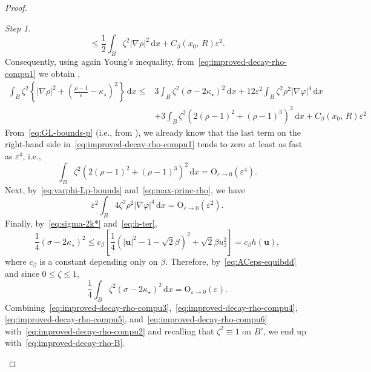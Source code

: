 \documentclass[a4paper, 11pt, twoside, leqno]{article}
\theoremstyle{definition}              %
\theoremstyle{remark}                  %
\newtheorem{step}{Step}
\newcommand{\abs}[1]{\left| #1 \right|}                             %
\renewcommand{\d}{\mathrm{d}}
\renewcommand{\u}{\mathbf{u}}
\newcommand{\eps}{\varepsilon}
\begin{document}
\begin{proof}
\begin{step}
\[		\leq \frac{1}{2} \int_B \zeta^2 \abs{\nabla \rho}^2\,{\d}x + C_\beta(x_0,\,R) \eps^2.
	\]
	Consequently, using again Young's inequality, 
	from~\eqref{eq:improved-decay-rho-compu1} 
	we obtain , 
	\begin{equation}\label{eq:improved-decay-rho-compu3}
	\begin{split}
		\int_B \zeta^2 \left\{ \abs{\nabla \rho}^2 + \left(\frac{\rho-1}{\eps} - \kappa_\star\right)^2 \right\} \,{\d}x 
		\leq & 3 \int_B \zeta^2 (\sigma - 2 \kappa_\star)^2 \,{\d}x 
		+ 12 \eps^2 \int_B \zeta^2 \rho^2 \abs{\nabla \varphi}^4   \,{\d}x \\
		&+ 3 \int_B \zeta^2 \left( 2 (\rho-1)^2 + (\rho-1)^3 \right)^2 \,{\d}x 
		+ C_\beta(x_0,\,R) \eps^2
	\end{split}
	\end{equation}
	From~\eqref{eq:GL-bounds-p} (i.e., from \cite[Proposition~2.6]{CDS1}), we already 
	know that the last term on the right-hand side 
	in~\eqref{eq:improved-decay-rho-compu1} tends to zero at least 
	as fast as $\eps^4$, i.e., 
	\begin{equation}\label{eq:improved-decay-rho-compu4}
		\int_B \zeta^2 \left( 2 (\rho-1)^2 + (\rho-1)^3 \right)^2 \,{\d}x
		= \mathrm{O}_{\eps \to 0}(\eps^4).
	\end{equation}	   
	Next, by~\eqref{eq:varphi-Lp-bounds} and~\eqref{eq:max-princ-rho}, we have 
	\begin{equation}\label{eq:improved-decay-rho-compu5}
		\eps^2 \int_B 4 \zeta^2 \rho^2 \abs{\nabla \varphi}^4 \,{\d}x 
		= \mathrm{O}_{\eps \to 0}(\eps^2).
	\end{equation}
	Finally, by~\eqref{eq:sigma-2k*} and~\eqref{eq:h-ter}, 
	\[
		\frac{1}{4} (\sigma - 2 \kappa_\star)^2
		\leq c_\beta\left[ \frac{1}{4}\left(\abs{\u}^2 - 1 - \sqrt{2}\beta \right)^2 + \sqrt{2}\beta u_2^2 \right]
		= c_\beta h(\u),
	\]
	where $c_\beta$ is a constant depending only on $\beta$. 
	Therefore, by~\eqref{eq:ACeps-equibdd} and since $0 \leq \zeta \leq 1$,
	\begin{equation}\label{eq:improved-decay-rho-compu6}
		\frac{1}{4} \int_B \zeta^2 (\sigma - 2 \kappa_\star)^2 \,{\d}x = \mathrm{O}_{\eps \to 0} (\eps).
	\end{equation}
	Combining~\eqref{eq:improved-decay-rho-compu3},~\eqref{eq:improved-decay-rho-compu4}, 
	\eqref{eq:improved-decay-rho-compu5}, and~\eqref{eq:improved-decay-rho-compu6} 
	with~\eqref{eq:improved-decay-rho-compu2} and 
	recalling that $\zeta^2 \equiv 1$ on $B'$, 
	we end up with~\eqref{eq:improved-decay-rho-B}.
\end{step}

\end{proof}
\end{document}
